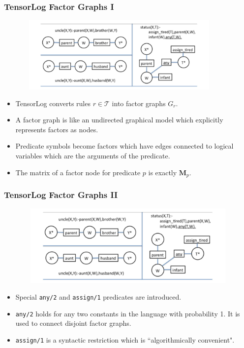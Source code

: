 \documentclass{beamer}
\begin{document}
\begin{frame}[fragile]
\frametitle{TensorLog Factor Graphs I}
\begin{figure}
	\begin{center}
		\includegraphics[width=10.25cm, height=3.7cm]{tensorlog}
	\end{center}
\end{figure}
\begin{itemize}
	\item TensorLog converts rules $r \in \mathcal{T}$ into factor graphs $G_r$. 
	\item  A factor graph is like an undirected graphical model which explicitly represents factors as nodes.
	\item Predicate symbols become factors which have edges connected to logical variables which are the arguments of the predicate.
	\item The matrix of a factor node for predicate $p$ is exactly $\textbf{M}_p$.
\end{itemize}
\end{frame}

\begin{frame}[fragile]
\frametitle{TensorLog Factor Graphs II}
\begin{figure}
	\begin{center}
		\includegraphics[width=11.25cm, height=4cm]{tensorlog}
	\end{center}
\end{figure}
\begin{itemize}
	\item Special \verb!any/2! and \verb!assign/1! predicates are introduced.
	\item  \verb!any/2! holds for any two constants in the language with probability 1.  It is used to connect disjoint factor graphs.
	\item \verb!assign/1! is a syntactic restriction which is ``algorithmically convenient".
\end{itemize}
\end{frame}
\end{document}
